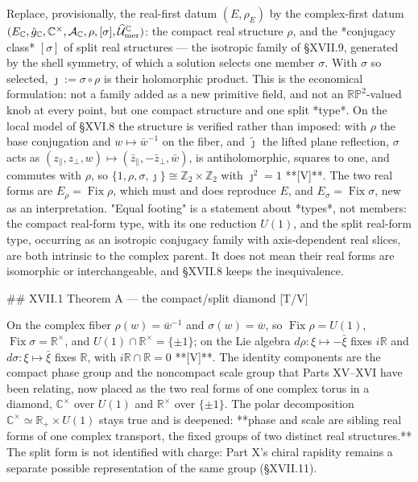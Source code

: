Replace, provisionally, the real-first datum $(E,\rho_E)$ by the complex-first datum $(E_{\mathbb C},\hat g_{\mathbb C},\mathbb C^\times,\mathcal A_{\mathbb C},\rho,[\sigma],\widehat{\mathcal U}^{\mathbb C}_{\rm mer})$: the compact real structure $\rho$, and the *conjugacy class* $[\sigma]$ of split real structures — the isotropic family of §XVII.9, generated by the shell symmetry, of which a solution selects one member $\sigma$. With $\sigma$ so selected, $\jmath := \sigma\circ\rho$ is their holomorphic product. This is the economical formulation: not a family added as a new primitive field, and not an $\mathbb{RP}^2$-valued knob at every point, but one compact structure and one split *type*. On the local model of §XVI.8 the structure is verified rather than imposed: with $\rho$ the base conjugation and $w\mapsto\bar w^{-1}$ on the fiber, and $\widetilde\jmath$ the lifted plane reflection, $\sigma$ acts as $(z_\parallel,z_\perp,w)\mapsto(\bar z_\parallel,-\bar z_\perp,\bar w)$, is antiholomorphic, squares to one, and commutes with $\rho$, so $\{1,\rho,\sigma,\jmath\}\cong\mathbb Z_2\times\mathbb Z_2$ with $\jmath^2 = 1$ **[V]**. The two real forms are $E_\rho = \operatorname{Fix}\rho$, which must and does reproduce $E$, and $E_\sigma = \operatorname{Fix}\sigma$, new as an interpretation. "Equal footing" is a statement about *types*, not members: the compact real-form type, with its one reduction $U(1)$, and the split real-form type, occurring as an isotropic conjugacy family with axis-dependent real slices, are both intrinsic to the complex parent. It does not mean their real forms are isomorphic or interchangeable, and §XVII.8 keeps the inequivalence.

## XVII.1 Theorem A — the compact/split diamond [T/V]

On the complex fiber $\rho(w) = \bar w^{-1}$ and $\sigma(w) = \bar w$, so $\operatorname{Fix}\rho = U(1)$, $\operatorname{Fix}\sigma = \mathbb R^\times$, and $U(1)\cap\mathbb R^\times = \{\pm1\}$; on the Lie algebra $d\rho:\xi\mapsto-\bar\xi$ fixes $i\mathbb R$ and $d\sigma:\xi\mapsto\bar\xi$ fixes $\mathbb R$, with $i\mathbb R\cap\mathbb R = 0$ **[V]**. The identity components are the compact phase group and the noncompact scale group that Parts XV–XVI have been relating, now placed as the two real forms of one complex torus in a diamond, $\mathbb C^\times$ over $U(1)$ and $\mathbb R^\times$ over $\{\pm1\}$. The polar decomposition $\mathbb C^\times\simeq\mathbb R_+\times U(1)$ stays true and is deepened: **phase and scale are sibling real forms of one complex transport, the fixed groups of two distinct real structures.** The split form is not identified with charge: Part X's chiral rapidity remains a separate possible representation of the same group (§XVII.11).

